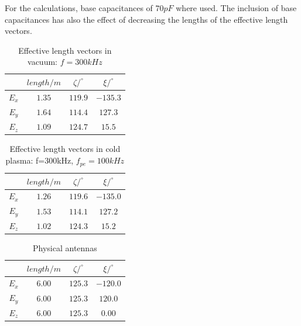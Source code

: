 \documentclass[two-column,ras]{agutex}
\begin{document}
\begin{article}
For the calculations, base capacitances of $70pF$ where used. The inclusion of base capacitances has also the effect of decreasing the lengths of the effective length vectors.\\


\begin{table}
\caption{Effective length vectors in vacuum: $f=300kHz$}
\label{tab:heff_vacuum_stereo}
\begin{tabular}{|c|c|c|c|}
 \hline
 & $length/m$ & $\zeta/^\circ$ & $\xi/^\circ$ \\
\hline
$E_x$ & $1.35$ & $119.9$ & $-135.3$ \\
$E_y$ & $1.64$ & $114.4$ & $127.3$ \\
$E_z$ & $1.09$ & $124.7$ & $15.5$ \\
\hline\end{tabular}
\end{table}



\begin{table}
\caption{Effective length vectors in cold plasma: f=300kHz, $f_{pe}=100kHz$}
\label{tab:heff_cold_plasma_stereo}
\begin{tabular}{|c|c|c|c|}
 \hline
 & $length/m$ & $\zeta/^\circ$ & $\xi/^\circ$ \\
\hline
$E_x$ & $1.26$ & $119.6$ & $-135.0$ \\
$E_y$ & $1.53$ & $114.1$ & $127.2$ \\
$E_z$ & $1.02$ & $124.3$ & $15.2$ \\
\hline\end{tabular}
\end{table}

\begin{table}
\caption{Physical antennas}
\label{tab:phys_ant}
\begin{tabular}{|c|c|c|c|}
 \hline
 & $length/m$ & $\zeta/^\circ$ & $\xi/^\circ$ \\
\hline
$E_x$ & $6.00$ & $125.3$ & $-120.0$ \\
$E_y$ & $6.00$ & $125.3$ & $120.0$ \\
$E_z$ & $6.00$ & $125.3$ & $0.00$ \\
\hline\end{tabular}
\end{table}


\end{article}
\end{document}
